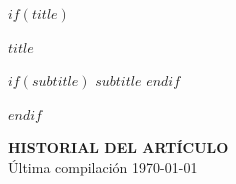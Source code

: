 $if(title)$
\begin{center}
\vspace*{2em}
{\LARGE\bfseries $title$}

$if(subtitle)$
{\large $subtitle$}
$endif$

\vspace{3em}
\end{center}
$endif$

\noindent\textbf{HISTORIAL DEL ARTÍCULO}\\
Última compilación \today

\vspace{1.5em}